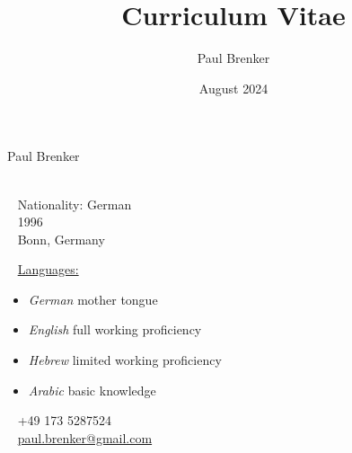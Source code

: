 \documentclass{style/modernsimplecv}
\title{Curriculum Vitae}
\author{Paul Brenker}
\date{August 2024}
\begin{document}
\thispagestyle{empty}




\begin{minipage}[t]{0.21\textwidth}
    \vspace{0pt} %
\end{minipage}
\hfill
\begin{minipage}[t]{1\textwidth}
    \vspace{0pt} %
    \begin{shaded*}

        \begin{minipage}[t]{0.47\textwidth}
            \vspace{0pt} %
            {\par\centering\huge{Paul Brenker}} \\[0.3cm]
            \faGlobe~ Nationality: German\\
            \faBirthdayCake~ 1996 \\
            \faMapMarker~ Bonn, Germany \\
            \begin{spacing}{0.5}
                {\small
                    \faCommentsO~ \underline{Languages:}

                    \begin{itemize}
                        \item \emph{German} mother tongue
                        \item \emph{English} full working proficiency
                        \item \emph{Hebrew} limited working proficiency
                        \item \emph{Arabic} basic knowledge
                    \end{itemize}
                }
            \end{spacing}
            \vspace{4pt} %
        \end{minipage}\hfill
        \begin{minipage}[t]{0.46\textwidth}
            \vspace{29pt} %
            \faPhone~ +49 173 5287524 \\
            \faAt~ \protect\url{paul.brenker@gmail.com} \\


\end{minipage}
\end{shaded*}
\end{minipage}
\end{document}
